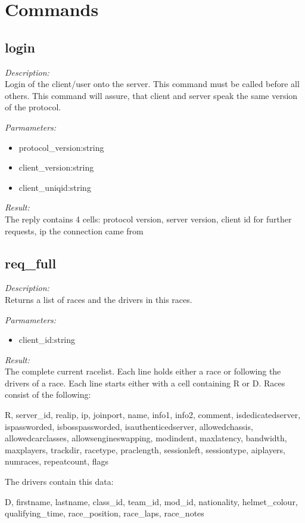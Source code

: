 \section{Commands}

\subsection{login}

\begin{description}
\item {\it Description:}\\
Login of the client/user onto the server. This command must be called before all others. This command will assure, that client and server speak the same version of the protocol.
\item {\it Parmameters:}
\begin{itemize}
\item protocol\_version:string
\item client\_version:string
\item client\_uniqid:string
\end{itemize}
\item {\it Result:}\\
The reply contains 4 cells: protocol version, server version, client id for further requests, ip the connection came from
\end{description}

\subsection{req\_full}

\begin{description}
\item {\it Description:}\\
Returns a list of races and the drivers in this races.
\item {\it Parmameters:}
\begin{itemize}
\item client\_id:string
\end{itemize}
\item {\it Result:}\\
The complete current racelist. Each line holds either a race or following the drivers of a race. Each line starts either with a cell containing R or D. Races consist of the following: 
			
		R, 
		server\_id, 
		realip, 
		ip, 
		joinport, 
		name, 
		info1, 
		info2, 
		comment, 
		isdedicatedserver, 
		ispassworded, 
		isbosspassworded, 
		isauthenticedserver, 
		allowedchassis, 
		allowedcarclasses, 
		allowsengineswapping, 
		modindent, 
		maxlatency, 
		bandwidth, 
		maxplayers, 
		trackdir, 
		racetype, 
		praclength, 
		sessionleft, 
		sessiontype,
		aiplayers,
		numraces,
		repeatcount,
		flags


		The drivers contain this data:

		D,
		firstname,
		lastname,
		class\_id,
		team\_id,
		mod\_id,
		nationality,
		helmet\_colour,
		qualifying\_time,
		race\_position,
		race\_laps,
		race\_notes
		
\end{description}

